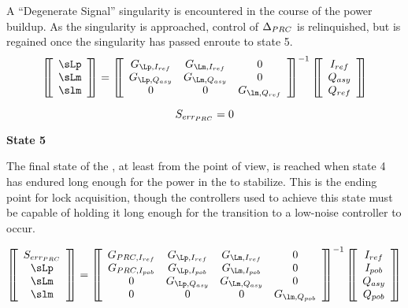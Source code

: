 \documentclass[12pt]{article}
\newcommand{\tit}[1]{\begin{center}\textbf{\Huge{#1}}\end{center}\vspace{1ex}}
\begin{document}
A ``Degenerate Signal'' singularity is encountered in the course of
 the power buildup.
As the singularity is approached,
 control of $\Delta_{PRC}$ is relinquished,
 but is regained once the singularity has
 passed enroute to state 5.
\begin{equation*}
\matrixBegin{c}
 \sLp \\
 \sLm \\
 \slm \\
\matrixEnd
 =
\matrixBegin{ccc}
 G_{\Lp, I_{ref}} & G_{\Lm, I_{ref}} & 0 \\
 G_{\Lp, Q_{asy}} & G_{\Lm, Q_{asy}} & 0 \\
 0 & 0 & G_{\lm, Q_{ref}} \\
\matrixEnd^{-1}
\matrixBegin{c}
 I_{ref} \\
 Q_{asy} \\
 Q_{ref} \\
\matrixEnd
\end{equation*}

\begin{equation*}
 S_{err_{PRC}} = 0
\end{equation*}

\newpage
\tit{State 5}



The final state of the \ifo, at least from the \la{} point of view,
 is reached when state 4 has endured long enough for the power in
 the \ifo{} to stabilize.
This is the ending point for lock acquisition, though
 the controllers used to achieve this state must be capable of
 holding it long enough for the transition to a low-noise controller
 to occur.

\begin{equation*}
\matrixBegin{c}
 \slp \\
 \sLp \\
 \sLm \\
 \slm \\
\matrixEnd
 =
\matrixBegin{cccc}
 G_{\lp, I_{ref}} & G_{\Lp, I_{ref}} & G_{\Lm, I_{ref}} & 0 \\
 G_{\lp, I_{pob}} & G_{\Lp, I_{pob}} & G_{\Lm, I_{pob}} & 0 \\
 0                & G_{\Lp, Q_{asy}} & G_{\Lm, Q_{asy}} & 0 \\
 0                & 0 & 0 & G_{\lm, Q_{pob}} \\
\matrixEnd^{-1}
\matrixBegin{c}
 I_{ref} \\
 I_{pob} \\
 Q_{asy} \\
 Q_{pob} \\
\matrixEnd
\end{equation*}
\end{document}
